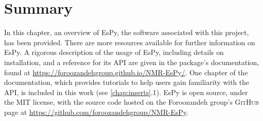 \section{Summary}
In this chapter, an overview of \ac{EsPy}, the software associated with this project,
has been provided.
There are more resources available for further information on \ac{EsPy}. A rigorous
description of the usage of \ac{EsPy}, including details on installation, and a
reference for its \ac{API} are given in the package's documentation, found
at \url{https://foroozandehgroup.github.io/NMR-EsPy/}.
One chapter of the documentation, which provides tutorials to help users gain
familiarity with the \ac{API}, is included in this work (see \cref{chap:inserts}.1).
\ac{EsPy} is open source, under the \textsc{MIT} license, with the source code
hosted on the Foroozandeh group's \textsc{GitHub} page at
\url{https://github.com/foroozandehgroup/NMR-EsPy}.
